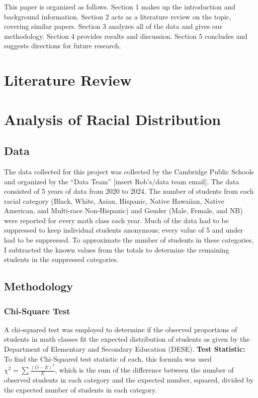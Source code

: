 \documentclass{article}
\begin{document}
This paper is organized as follows. Section 1 makes up the introduction and background information. Section 2 acts as a literature review on the topic, covering similar papers. Section 3 analyzes all of the data and gives our methodology. Section 4 provides results and discussion. Section 5 concludes and suggests directions for future research. 


\section{Literature Review}

\section{Analysis of Racial Distribution}
\subsection{Data}
The data collected for this project was collected by the Cambridge Public Schools and organized by the “Data Team” [insert Rob’s/data team email]. The data consisted of 5 years of data from 2020 to 2024. The number of students from each racial category (Black, White, Asian, Hispanic, Native Hawaiian, Native American, and Multi-race Non-Hispanic) and Gender (Male, Female, and NB) were reported for every math class each year. Much of the data had to be suppressed to keep individual students anonymous; every value of 5 and under had to be suppressed. To approximate the number of students in these categories, I subtracted the known values from the totals to determine the remaining students in the suppressed categories. 
\subsection{Methodology}
\subsubsection{Chi-Square Test}
A chi-squared test was employed to determine if the observed proportions of students in math classes fit the expected distribution of students as given by the Department of Elementary and Secondary Education (DESE). 
\textbf{Test Statistic:}
To find the Chi-Squared test statistic of each, this formula was used 
$\chi^2 = \sum \frac{(O - E)^2}{E}$, which is the sum of the difference between the number of observed students in each category and the expected number, squared, divided by the expected number of students in each category.
\end{document}
